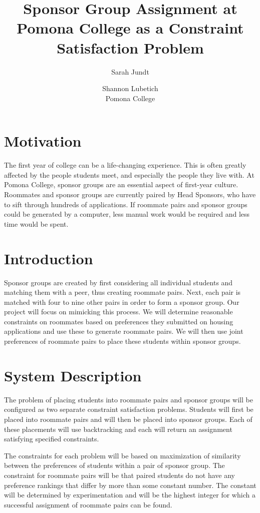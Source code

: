 \documentclass[letterpaper]{article}
\title{Sponsor Group Assignment at Pomona College as a Constraint Satisfaction Problem}
\author{Sarah Jundt \and Shannon Lubetich\\
Pomona College\\}
\begin{document}
\maketitle


\section{Motivation}
The first year of college can be a life-changing experience. This is often greatly affected by the people students meet, and especially the people they live with. At Pomona College, sponsor groups are an essential aspect of first-year culture. Roommates and sponsor groups are currently paired by Head Sponsors, who have to sift through hundreds of applications. If roommate pairs and sponsor groups could be generated by a computer, less manual work would be required and less time would be spent.

\section{Introduction}
Sponsor groups are created by first considering all individual students and matching them with a peer, thus creating roommate pairs. Next, each pair is matched with four to nine other pairs in order to form a sponsor group. Our project will focus on mimicking this process. We will determine reasonable constraints on roommates based on preferences they submitted on housing applications and use these to generate roommate pairs. We will then use joint preferences of roommate pairs to place these students within sponsor groups.

\section{System Description}
The problem of placing students into roommate pairs and sponsor groups will be configured as two separate constraint satisfaction problems. Students will first be placed into roommate pairs and will then be placed into sponsor groups. Each of these placements will use backtracking and each will return an assignment satisfying specified constraints. 

The constraints for each problem will be based on maximization of similarity between the preferences of students within a pair of sponsor group. The constraint for roommate pairs will be that paired students do not have any preference rankings that differ by more than some constant number. The constant will be determined by experimentation and will be the highest integer for which a successful assignment of roommate pairs can be found.
\end{document}
